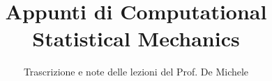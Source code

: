 \documentclass[a4paper,12pt]{article}
\title{Appunti di Computational Statistical Mechanics}
\author{Trascrizione e note delle lezioni del Prof. De Michele}
\date{}
\begin{document}
\maketitle
\projectintro

\newpage

\tableofcontents
\newpage

% 
% 
% 
% 
% 
\end{document}

